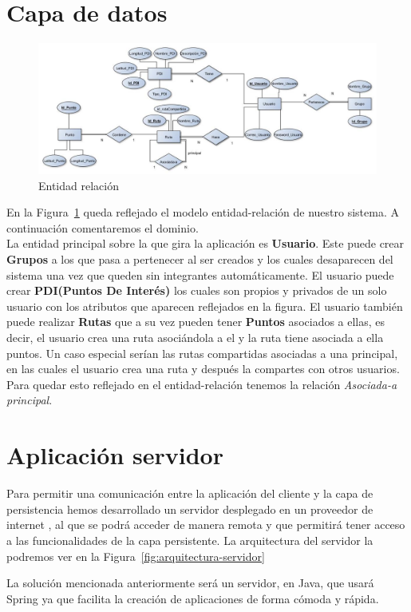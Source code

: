 \section{Capa de datos}
\begin{figure}[H]
		\centering
		\includegraphics[width=\textwidth] {BD.jpg}
		\caption{Entidad relación  }\label{fig:BD}
	\end{figure}
	En la Figura~\ref{fig:BD} queda reflejado el modelo  entidad-relación de nuestro sistema. A continuación comentaremos el dominio.\\
La entidad principal sobre la que gira la aplicación es \textbf{Usuario}. Este puede crear \textbf{Grupos} a los que pasa a pertenecer al ser creados y los cuales desaparecen del sistema una vez que queden sin integrantes automáticamente.  El usuario puede crear \textbf{PDI(Puntos De Interés)} los cuales son propios y privados de un solo usuario con los atributos que aparecen reflejados en la figura. El usuario también puede realizar \textbf{Rutas} que a su vez pueden tener \textbf{Puntos} asociados a ellas, es decir, el  usuario crea una ruta asociándola a el y la ruta tiene asociada a ella puntos.
 Un caso especial serían las rutas compartidas asociadas a una principal, en las cuales el usuario crea una ruta y después la compartes con otros usuarios. Para  quedar esto reflejado en el entidad-relación tenemos la relación \textit{Asociada-a principal}.
	
\section{Aplicación servidor}
Para permitir una comunicación entre la aplicación del cliente y la capa de persistencia hemos desarrollado un servidor desplegado en un proveedor de internet , al que se podrá acceder de manera remota y que permitirá tener acceso a las funcionalidades de la capa persistente. La arquitectura del servidor la podremos ver en la Figura~\ref{fig:arquitectura-servidor}

La solución mencionada anteriormente será un servidor, en Java, que  usará Spring \cite{10} ya que facilita la creación de aplicaciones de forma cómoda y rápida.\\

